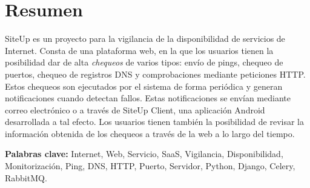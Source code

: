 \section*{Resumen}

SiteUp es un proyecto para la vigilancia de la disponibilidad de servicios de
Internet. Consta de una plataforma web, en la que los usuarios tienen la
posibilidad dar de alta \textit{chequeos} de varios tipos: envío de pings,
chequeo de puertos, chequeo de registros DNS y comprobaciones mediante
peticiones HTTP. Estos chequeos son ejecutados por el sistema de forma periódica
y generan notificaciones cuando detectan fallos. Estas notificaciones se envían
mediante correo electrónico o a través de SiteUp Client, una aplicación Android
desarrollada a tal efecto. Los usuarios tienen también la posibilidad de revisar
la información obtenida de los chequeos a través de la web a lo largo del tiempo.

\textbf{Palabras clave:} Internet, Web, Servicio, SaaS, Vigilancia, Disponibilidad,
Monitorización, Ping, DNS, HTTP, Puerto, Servidor, Python, Django, Celery, RabbitMQ.

